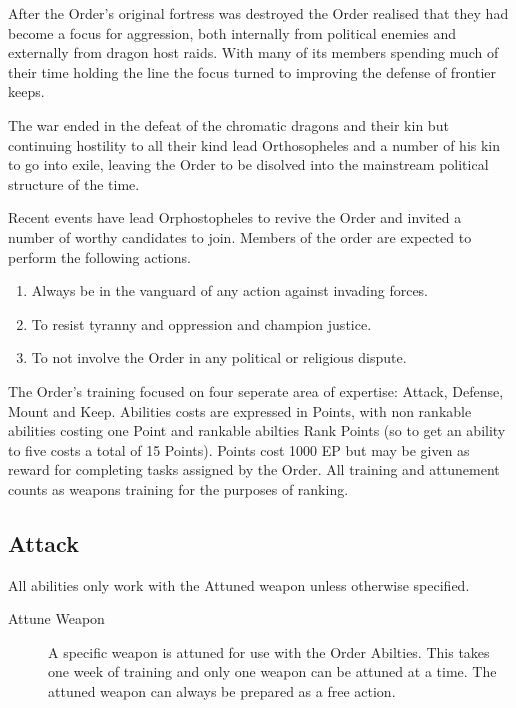 \documentclass[a4paper]{article}
\begin{document}
\begin{multicols*}{3}
After the Order's original fortress was destroyed the Order realised
that they had become a focus for aggression, both internally from
political enemies and externally from dragon host raids.  With many of
its members spending much of their time holding the line the focus
turned to improving the defense of frontier keeps.

The war ended in the defeat of the chromatic dragons and their kin but
continuing hostility to all their kind lead Orthosopheles and a number
of his kin to go into exile, leaving the Order to be disolved into the
mainstream political structure of the time.

Recent events have lead Orphostopheles to revive the Order and invited
a number of worthy candidates to join.  Members of the order are
expected to perform the following actions.
\begin{enumerate}
\item Always be in the vanguard of any action against invading forces.

\item To resist tyranny and oppression and champion justice.

\item To not involve the Order in any political or religious dispute.

\end{enumerate}

The Order's training focused on four seperate area of expertise:
Attack, Defense, Mount and Keep.  Abilities costs are expressed in
Points, with non rankable abilities costing one Point and rankable
abilties Rank Points (so to get an ability to five costs a total of 15
Points).  Points cost 1000 EP but may be given as reward for
completing tasks assigned by the Order.  All training and attunement
counts as weapons training for the purposes of ranking.

\subsection{Attack}

All abilities only work with the Attuned weapon unless otherwise
specified.

\begin{description}

\item[Attune Weapon] A specific weapon is attuned for use with the
  Order Abilties.  This takes one week of training and only one weapon
  can be attuned at a time.  The attuned weapon can always be prepared
  as a free action.


\end{description}
\end{multicols*}
\end{document}
